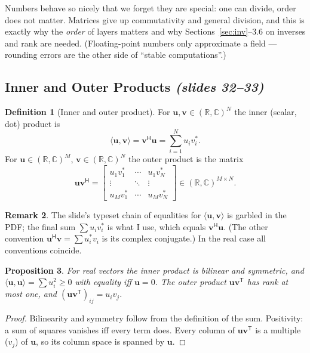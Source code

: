 \documentclass[11pt,a4paper]{article}
\newcommand{\R}{\mathbb{R}}
\newcommand{\C}{\mathbb{C}}
\newcommand{\T}{^{\mathsf{T}}}
\newcommand{\Her}{^{\mathsf{H}}}
\newcommand{\slides}[1]{\texorpdfstring{\emph{(slides #1)}}{(slides #1)}}
\theoremstyle{definition}
\newtheorem{definition}{Definition}[section]
\newtheorem{remark}[definition]{Remark}
\theoremstyle{plain}
\newtheorem{proposition}[definition]{Proposition}
\begin{document}
\begin{intuition}
Numbers behave so nicely that we forget they are special: one can divide, order does not matter. Matrices give up commutativity and general division, and this is exactly why the \emph{order} of layers matters and why Sections~\ref{sec:inv}--3.6 on inverses and rank are needed. (Floating-point numbers only approximate a field --- rounding errors are the other side of ``stable computations''.)
\end{intuition}

\subsection{Inner and Outer Products \slides{32--33}}

\begin{definition}[Inner and outer product]
For $\mathbf u,\mathbf v\in(\R,\C)^{N}$ the inner (scalar, dot) product is
\[
\langle\mathbf u,\mathbf v\rangle=\mathbf v\Her\mathbf u=\sum_{i=1}^{N}u_iv_i^{*}.
\]
For $\mathbf u\in(\R,\C)^{M}$, $\mathbf v\in(\R,\C)^{N}$ the outer product is the matrix
\[
\mathbf u\mathbf v\Her=\begin{bmatrix}u_1v_1^*&\cdots&u_1v_N^*\\\vdots&\ddots&\vdots\\u_Mv_1^*&\cdots&u_Mv_N^*\end{bmatrix}\in(\R,\C)^{M\times N}.
\]
\end{definition}

\begin{remark}
The slide's typeset chain of equalities for $\langle\mathbf u,\mathbf v\rangle$ is garbled in the PDF; the final sum $\sum u_iv_i^*$ is what I use, which equals $\mathbf v\Her\mathbf u$. (The other convention $\mathbf u\Her\mathbf v=\sum u_i^*v_i$ is its complex conjugate.) In the real case all conventions coincide.
\end{remark}

\begin{proposition}
For real vectors the inner product is bilinear and symmetric, and $\langle\mathbf u,\mathbf u\rangle=\sum u_i^2\ge0$ with equality iff $\mathbf u=0$. The outer product $\mathbf u\mathbf v\T$ has rank at most one, and $(\mathbf u\mathbf v\T)_{ij}=u_iv_j$.
\end{proposition}
\begin{proof}
Bilinearity and symmetry follow from the definition of the sum. Positivity: a sum of squares vanishes iff every term does. Every column of $\mathbf u\mathbf v\T$ is a multiple ($v_j$) of $\mathbf u$, so its column space is spanned by $\mathbf u$.
\end{proof}
\end{document}
